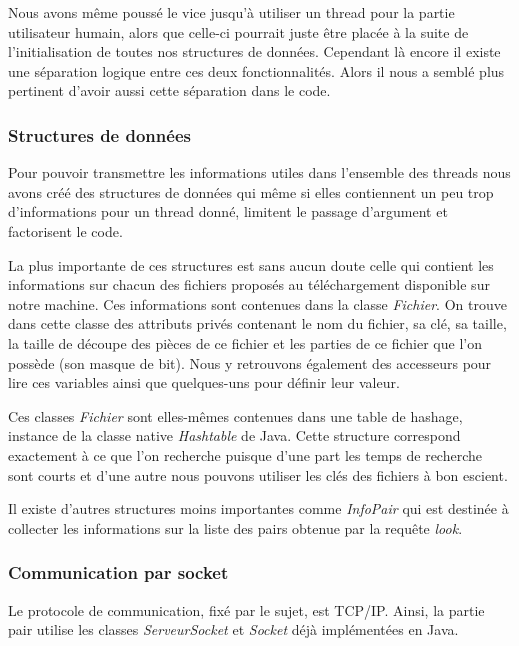 Nous avons même poussé le vice jusqu'à utiliser un thread pour la
partie utilisateur humain, alors que celle-ci pourrait juste être placée
à la suite de l'initialisation de toutes nos structures de
données. Cependant là encore il existe une séparation logique entre
ces deux fonctionnalités. Alors il nous a semblé plus pertinent
d'avoir aussi cette séparation dans le code.

\subsubsection{Structures de données}
Pour pouvoir transmettre les informations utiles dans l'ensemble des
threads nous avons créé des structures de données qui même si elles
contiennent un peu trop d'informations pour un thread donné, limitent le
passage d'argument et factorisent le code.

La plus importante de ces structures est sans aucun doute celle qui
contient les informations sur chacun des fichiers proposés au
téléchargement disponible sur notre machine. Ces informations sont
contenues dans la classe \textit{Fichier}. On trouve dans cette classe
des attributs privés contenant le nom du fichier, sa clé, sa taille,
la taille de découpe des pièces de ce fichier et les parties de ce
fichier que l'on possède (son masque de bit). Nous y retrouvons
également des accesseurs pour lire ces variables ainsi que quelques-uns
pour définir leur valeur. 

Ces classes \textit{Fichier} sont elles-mêmes contenues dans une table
de hashage, instance de la classe native \textit{Hashtable} de Java.
Cette structure correspond exactement à ce que l'on recherche puisque
d'une part les temps de recherche sont courts et d'une autre nous
pouvons utiliser les clés des fichiers à bon escient.

Il existe d'autres structures moins importantes comme
\textit{InfoPair} qui est destinée à collecter les informations sur la
liste des pairs obtenue par la requête \textit{look}.

%
%


\subsubsection{Communication par socket}
Le protocole de communication, fixé par le sujet, est TCP/IP. Ainsi, 
la partie pair utilise les classes \textit{ServeurSocket}
et \textit{Socket} déjà implémentées en Java.

